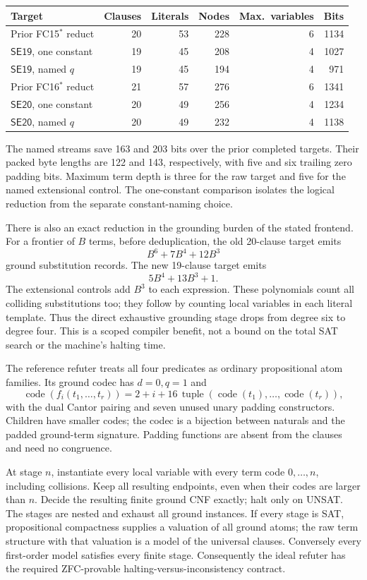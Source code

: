 \begin{center}\small
\begin{tabular}{lrrrrr}
\toprule
Target & Clauses & Literals & Nodes & Max.\ variables & Bits\\
\midrule
Prior FC15$^*$ reduct &20&53&228&6&1134\\
$\mathsf{SE19}$, one constant &19&45&208&4&1027\\
$\mathsf{SE19}$, named $q$ &19&45&194&4&971\\
Prior FC16$^*$ reduct &21&57&276&6&1341\\
$\mathsf{SE20}$, one constant &20&49&256&4&1234\\
$\mathsf{SE20}$, named $q$ &20&49&232&4&1138\\
\bottomrule
\end{tabular}
\end{center}
The named streams save 163 and 203 bits over the prior completed
targets. Their packed byte lengths are 122 and 143, respectively,
with five and six trailing zero padding bits. Maximum term depth is
three for the raw target and five for the named extensional control.
The one-constant comparison isolates the logical reduction from the
separate constant-naming choice.

There is also an exact reduction in the grounding burden of the stated
frontend. For a frontier of $B$ terms, before deduplication, the old
20-clause target emits
\[
 B^6+7B^4+12B^3
\]
ground substitution records. The new 19-clause target emits
\[
 5B^4+13B^3+1.
\]
The extensional controls add $B^3$ to each expression. These polynomials
count all colliding substitutions too; they follow by counting local
variables in each literal template. Thus the direct exhaustive grounding
stage drops from degree six to degree four. This is a scoped compiler
benefit, not a bound on the total SAT search or the machine's halting time.

The reference refuter treats all four predicates as ordinary
propositional atom families. Its ground codec has $d=0,q=1$ and
\[
 \operatorname{code}(f_i(t_1,\ldots,t_r))
 =2+i+16\,\operatorname{tuple}(\operatorname{code}(t_1),\ldots,
                              \operatorname{code}(t_r)),
\]
with the dual Cantor pairing and seven unused unary padding
constructors. Children have smaller codes; the codec is a bijection
between naturals and the padded ground-term signature. Padding
functions are absent from the clauses and need no congruence.

At stage $n$, instantiate every local variable with every term code
$0,\ldots,n$, including collisions. Keep all resulting endpoints,
even when their codes are larger than $n$. Decide the resulting
finite ground CNF exactly; halt only on UNSAT. The stages are nested
and exhaust all ground instances. If every stage is SAT,
propositional compactness supplies a valuation of all ground atoms;
the raw term structure with that valuation is a model of the
universal clauses. Conversely every first-order model satisfies
every finite stage. Consequently the ideal refuter has the required
ZFC-provable halting-versus-inconsistency contract.


